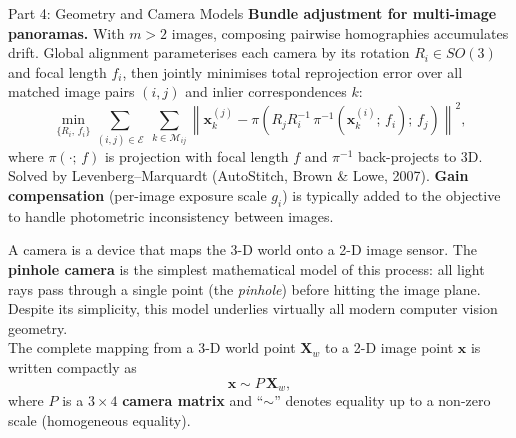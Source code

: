 \documentclass[letterpaper]{article}
\begin{document}
\begin{notes}{Part 4: Geometry and Camera Models}
\textbf{Bundle adjustment for multi-image panoramas.} With $m>2$ images, composing pairwise homographies accumulates drift. Global alignment parameterises each camera by its rotation $R_i\in SO(3)$ and focal length $f_i$, then jointly minimises total reprojection error over all matched image pairs $(i,j)$ and inlier correspondences $k$:
$$\min_{\{R_i,\,f_i\}} \sum_{(i,j)\in\mathcal{E}}\;\sum_{k\in\mathcal{M}_{ij}} \left\|\mathbf{x}_k^{(j)} - \pi\!\left(R_j R_i^{-1}\,\pi^{-1}\!\left(\mathbf{x}_k^{(i)};\,f_i\right);\,f_j\right)\right\|^2,$$
where $\pi(\cdot;\,f)$ is projection with focal length $f$ and $\pi^{-1}$ back-projects to 3D. Solved by Levenberg--Marquardt (AutoStitch, Brown \& Lowe, 2007). \textbf{Gain compensation} (per-image exposure scale $g_i$) is typically added to the objective to handle photometric inconsistency between images.







\columnbreaknofill


A camera is a device that maps the 3-D world onto a 2-D image sensor.
The \textbf{pinhole camera} is the simplest mathematical model of this process:
all light rays pass through a single point (the \emph{pinhole}) before hitting
the image plane.  Despite its simplicity, this model underlies virtually all modern computer vision geometry.\\

The complete mapping from a 3-D world point $\mathbf{X}_w$ to a 2-D image
point $\mathbf{x}$ is written compactly as
\[
  \mathbf{x} \sim P\,\mathbf{X}_w,
\]
where $P$ is a $3\times 4$ \textbf{camera matrix} and ``$\sim$'' denotes
equality up to a non-zero scale (homogeneous equality).




\end{notes}
\end{document}
